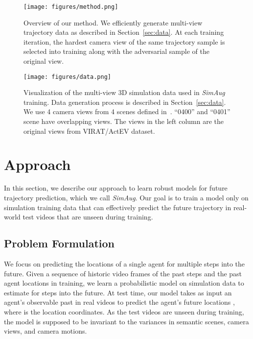 \documentclass[runningheads]{eccv2020/llncs}
\newcommand{\fancyname}{SimAug}
\begin{document}
 

\begin{figure}[ht]
	\centering
		\texttt{[image: figures/method.png]}
	\vspace{-8mm}
	\caption{Overview of our method. We efficiently generate multi-view trajectory data as described in Section~\ref{sec:data}. At each training iteration, the hardest camera view of the same trajectory sample is selected into training along with the adversarial sample of the original view.}
	\label{fig:method}
	\vspace{-6mm}
\end{figure}

\begin{figure}[]
	\centering
		\texttt{[image: figures/data.png]}
	\caption{Visualization of the multi-view 3D simulation data used in \textit{\fancyname} training. Data generation process is described in Section~\ref{sec:data}. We use 4 camera views from 4 scenes defined in~\cite{liang2020garden}. ``0400'' and ``0401'' scene have overlapping views. The views in the left column are the original views from VIRAT/ActEV dataset.}
	\label{fig:data}
\end{figure}

\section{Approach}
\label{sec:approach}
In this section, we describe our approach to learn robust models for future trajectory prediction, which we call \textit{\fancyname}. Our goal is to train a model only on simulation training data that can effectively predict the future trajectory in real-world test videos that are unseen during training.

\subsection{Problem Formulation}
We focus on predicting the locations of a single agent for multiple steps into the future. Given a sequence of historic video frames  of the past  steps and the past agent locations  in training, we learn a probabilistic model on simulation data to estimate  for  steps into the future. At test time, our model takes as input an agent's observable past  in real videos to predict the agent's future locations , where  is the location coordinates. As the test videos are unseen during training, the model is supposed to be invariant to the variances in semantic scenes, camera views, and camera motions. 
\end{document}
